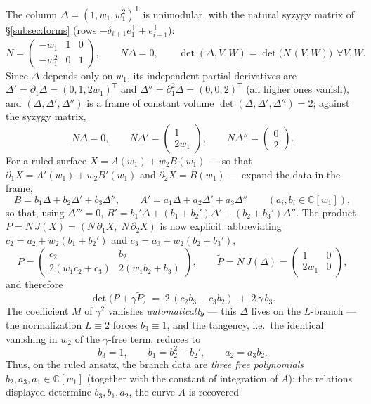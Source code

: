 \documentclass[11pt]{article}
\theoremstyle{plain}
\theoremstyle{definition}
\theoremstyle{remark}
\newcommand{\C}{\mathbb{C}}
\begin{document}
The column $\Delta=(1,w_1,w_1^2)^{\mathsf T}$ is unimodular, with the natural
syzygy matrix of \S\ref{subsec:forms} (rows
$-\delta_{i+1}e_1^{\mathsf T}+e_{i+1}^{\mathsf T}$):
\[
N=\begin{pmatrix}-w_1&1&0\\[1pt] -w_1^2&0&1\end{pmatrix},
\qquad N\Delta=0,\qquad
\det(\Delta,V,W)=\det\bigl(N\,(V,W)\bigr)\ \ \forall V,W .
\]
Since $\Delta$ depends only on $w_1$, its independent partial derivatives are
$\Delta'=\partial_1\Delta=(0,1,2w_1)^{\mathsf T}$ and
$\Delta''=\partial_1^2\Delta=(0,0,2)^{\mathsf T}$ (all higher ones vanish), and
$(\Delta,\Delta',\Delta'')$ is a frame of constant volume
$\det(\Delta,\Delta',\Delta'')=2$; against the syzygy matrix,
\[
N\Delta=0,\qquad
N\Delta'=\begin{pmatrix}1\\ 2w_1\end{pmatrix},\qquad
N\Delta''=\begin{pmatrix}0\\ 2\end{pmatrix}.
\]
For a ruled surface $X=A(w_1)+w_2B(w_1)$ --- so that
$\partial_1X=A'(w_1)+w_2B'(w_1)$ and $\partial_2X=B(w_1)$ --- expand the data
in the frame,
\[
B=b_1\Delta+b_2\Delta'+b_3\Delta'',\qquad
A'=a_1\Delta+a_2\Delta'+a_3\Delta''\qquad(a_i,b_i\in\C[w_1]),
\]
so that, using $\Delta'''=0$,
$B'=b_1'\Delta+(b_1+b_2')\Delta'+(b_2+b_3')\Delta''$. The product
$P=N\,J(X)=(N\,\partial_1X,\;N\,\partial_2X)$ is now explicit: abbreviating
$c_2=a_2+w_2(b_1+b_2')$ and $c_3=a_3+w_2(b_2+b_3')$,
\[
P=\begin{pmatrix}c_2 & b_2\\ 2(w_1c_2+c_3) & 2(w_1b_2+b_3)\end{pmatrix},
\qquad
\widetilde P=N\,J(\Delta)=\begin{pmatrix}1&0\\ 2w_1&0\end{pmatrix},
\]
and therefore
\[
\det\bigl(P+\gamma\widetilde P\bigr)\;=\;2\,(c_2b_3-c_3b_2)\;+\;2\,\gamma\,b_3 .
\]
The coefficient $M$ of $\gamma^2$ vanishes \emph{automatically} --- this
$\Delta$ lives on the $L$-branch --- the normalization $L\equiv2$ forces
$b_3\equiv1$, and the tangency, i.e.\ the identical vanishing in $w_2$ of the
$\gamma$-free term, reduces to
\[
b_3=1,\qquad b_1=b_2^2-b_2',\qquad a_2=a_3b_2 .
\]
Thus, on the ruled ansatz, the branch data are \emph{three free polynomials}
$b_2,a_3,a_1\in\C[w_1]$ (together with the constant of integration of $A$):
the relations displayed determine $b_3,b_1,a_2$, the curve $A$ is recovered
\end{document}
